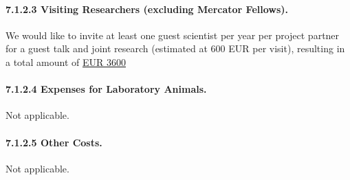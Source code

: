 \documentclass[11pt,a4paper]{article}
\def\PN{\mathrm{ISAD}}
\newcommand{\meinard}[1]{{\color{red} #1}}
\theoremstyle{plain} \newtheorem{define}{Definition}[section]
\begin{document}
{%
\paragraph*{7.1.2.3	Visiting Researchers (excluding Mercator Fellows).} 
%
We would like to invite at least one guest scientist per year per project partner for a guest talk and joint research (estimated at 600 EUR per visit), resulting in a total amount of
\hfill{\underline{EUR 3600}}\\
%
\vspace{-0.4cm}


\paragraph*{7.1.2.4	Expenses for Laboratory Animals.}
%
Not applicable.
\vspace{-0.4cm}

\paragraph*{7.1.2.5	Other Costs.}
%
Not applicable.
\vspace{-0.4cm}}

\end{document}
